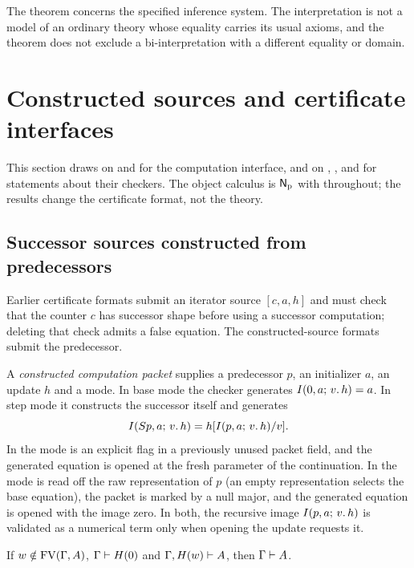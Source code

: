 The theorem concerns the specified inference system. The interpretation is not
a model of an ordinary theory whose equality carries its usual axioms, and the
theorem does not exclude a bi-interpretation with a different equality or
domain.

\section{Constructed sources and certificate interfaces}
\label{obs:sec:sources}

This section draws on  and
 for the computation interface, and on
, ,  and
 for statements about their checkers. The object calculus is
$\mathsf{N}_{\mathrm{p}}$ with  throughout; the results change the
certificate format, not the theory.

\subsection{Successor sources constructed from predecessors}

Earlier certificate formats submit an iterator source $[c,a,h]$ and must check
that the counter $c$ has successor shape before using a successor computation;
deleting that check admits a false equation. The constructed-source formats
submit the predecessor.

\begin{definition}
\label{obs:def:packets}
A \emph{constructed computation packet} supplies a predecessor $p$, an
initializer $a$, an update $h$ and a mode. In base mode the checker generates
$I(0,a;\,v.\,h)=a$. In step mode it constructs the successor itself and
generates
\[
I(S p,a;\,v.\,h)=h[I(p,a;\,v.\,h)/v].
\]
In  the mode is an explicit flag in a previously
unused packet field, and the generated equation is opened at the fresh
parameter of the continuation. In  the mode is read
off the raw representation of $p$ (an empty representation selects the base
equation), the packet is marked by a null major, and the generated equation is
opened with the image zero. In both, the recursive image
$I(p,a;\,v.\,h)$ is validated as a numerical term only when opening the update
requests it.
\end{definition}

\begin{lemma}
\label{obs:lem:known-instance}
If $w\notin\operatorname{FV}(\Gamma,A)$, $\Gamma\vdash H(0)$ and $\Gamma,H(w)\vdash A$,
then $\Gamma\vdash A$.
\end{lemma}

